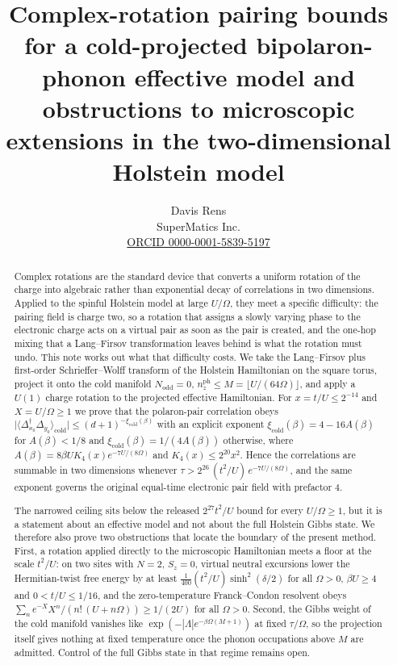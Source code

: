\documentclass[11pt]{article}
\title{Complex-rotation pairing bounds for a cold-projected bipolaron-phonon
effective model and obstructions to microscopic extensions in the
two-dimensional Holstein model}
\author{Davis Rens\\SuperMatics Inc.\\\href{https://orcid.org/0000-0001-5839-5197}{ORCID 0000-0001-5839-5197}}
\date{}
\theoremstyle{plain}
\theoremstyle{definition}
\newcommand{\Nodd}{N_{\mathrm{odd}}}
\newcommand{\Dop}{\Delta}
\begin{document}
\maketitle

\begin{abstract}
Complex rotations \cite{bfu} are the standard device that converts a uniform
rotation of the charge into algebraic rather than exponential decay of
correlations in two dimensions. Applied to the spinful
Holstein model at large $U/\Omega$, they meet a specific difficulty: the pairing
field is charge two, so a rotation that assigns a slowly varying phase to the
electronic charge acts on a virtual pair as soon as the pair is created, and the
one-hop mixing that a Lang--Firsov transformation leaves behind is what the
rotation must undo. This note works out what that difficulty costs. We take the
Lang--Firsov plus first-order Schrieffer--Wolff transform of the Holstein
Hamiltonian on the square torus, project it onto the cold manifold
$\Nodd=0$, $n^{\mathrm{ph}}_z\le M=\lfloor U/(64\Omega)\rfloor$, and apply a
$U(1)$ charge rotation to the projected effective Hamiltonian. For
$x=t/U\le2^{-14}$ and $X=U/\Omega\ge1$ we prove that the polaron-pair correlation
obeys $\bigl|\langle\Dop^\dagger_{x_0}\Dop_{y_0}\rangle_{\mathrm{cold}}\bigr|
\le(d+1)^{-\xi_{\mathrm{cold}}(\beta)}$ with an explicit exponent
$\xi_{\mathrm{cold}}(\beta)=4-16A(\beta)$ for $A(\beta)<1/8$ and
$\xi_{\mathrm{cold}}(\beta)=1/(4A(\beta))$ otherwise, where
$A(\beta)=8\beta UK_4(x)e^{-7U/(8\Omega)}$ and $K_4(x)\le2^{20}x^2$. Hence the
correlations are summable in two dimensions whenever
$\tau>2^{26}\,(t^2/U)\,e^{-7U/(8\Omega)}$, and the same exponent governs the
original equal-time electronic pair field with prefactor $4$.

The narrowed ceiling sits below the released $2^{27}t^{2}/U$ bound
\cite{rens2026a} for every $U/\Omega\ge1$, but it is a statement about an
effective model and not about the full Holstein Gibbs state. We therefore also
prove two obstructions that locate the boundary of the present method. First, a
rotation applied directly to the microscopic Hamiltonian meets a floor at the
scale $t^2/U$: on two sites with $N=2$, $S_z=0$, virtual neutral excursions lower the
Hermitian-twist free energy by at least
$\tfrac{1}{400}(t^2/U)\sinh^2(\delta/2)$ for all $\Omega>0$, $\beta U\ge4$ and
$0<t/U\le1/16$, and the zero-temperature Franck--Condon resolvent obeys
$\sum_n e^{-X}X^n/(n!\,(U+n\Omega))\ge1/(2U)$ for all $\Omega>0$. Second, the
Gibbs weight of the cold manifold vanishes like
$\exp(-|\Lambda|e^{-\beta\Omega(M+1)})$ at fixed $\tau/\Omega$, so the projection
itself gives nothing at fixed temperature once the phonon occupations above $M$
are admitted. Control of the full Gibbs state in that regime remains open.


\end{abstract}
\end{document}
